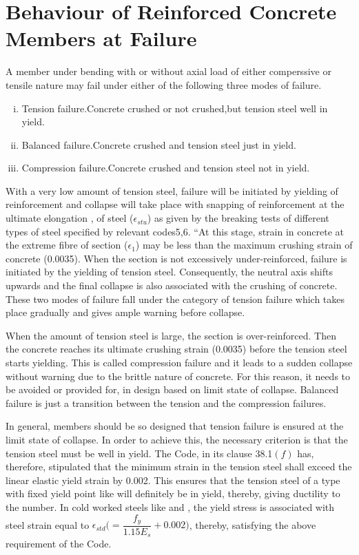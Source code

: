 \section{Behaviour of Reinforced Concrete Members at Failure}
A member under bending with or without axial load of either comperssive
or tensile nature may fail under either of the following three modes of
failure.

\begin{enumerate}[(i)]
\item Tension failure.Concrete crushed or not crushed,but tension steel well in yield.
\item Balanced failure.Concrete crushed and tension steel just in yield.
\item Compression failure.Concrete crushed and tension steel not in yield.
\end{enumerate}
With a very low amount of tension steel, failure will be initiated by
yielding of reinforcement and collapse will take place with snapping of
reinforcement at the ultimate elongation , of steel ($\epsilon_{stu}$) as
given by the breaking tests of different types of steel speciﬁed by
relevant codes5,6. “At this stage, strain in concrete at the extreme
fibre of section ($\epsilon_1$) may be less than the maximum crushing
strain of concrete (0.0035). When the section is not excessively
under-reinforced, failure is initiated by the yielding of tension steel.
Consequently, the neutral axis shifts upwards and the final collapse is
also associated with the crushing of concrete. These two modes of failure
fall under the category of tension failure which takes place gradually
and gives ample warning before collapse.

When the amount of tension steel is large, the section is over-reinforced.
Then the concrete reaches its ultimate crushing strain (0.0035)
before the tension steel starts yielding. This is called compression
failure and it leads to a sudden collapse without warning due to the
brittle nature of concrete. For this reason, it needs to be avoided or
provided for, in design based on limit state of collapse. Balanced
failure is just a transition between the tension and the compression
failures.

In general, members should be so designed that tension failure
is ensured at the limit state of collapse. In order to achieve this, the
necessary criterion is that the tension steel must be well in yield. The
Code, in its clause 38.1$(f)$ has, therefore, stipulated that the minimum
strain in the tension steel shall exceed the linear elastic yield strain
by 0.002. This ensures that the tension steel of a type with fixed yield
point like {\fetwofivezero} will deﬁnitely be in yield, thereby, giving
ductility to the number. In cold worked steels like {\fefouronefive} and
{\fefivezerozero}, the yield stress is associated with steel strain equal to              
$\epsilon_{std}\Bigg(=\dfrac{f_y}{1.15 E_s}+0.002\Bigg)$, thereby,
satisfying the above requirement of the Code.

